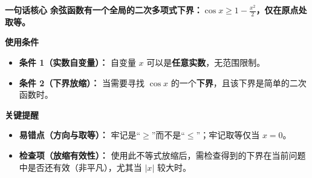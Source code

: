 \begin{summarybox}
\textbf{\textcolor{CSummary}{一句话核心}}
\textbf{余弦函数有一个全局的二次多项式下界：$\cos x \geq 1 - \frac{x^2}{2}$，仅在原点处取等。}

\medskip
\textbf{\textcolor{CSummary}{使用条件}}
\begin{itemize}[leftmargin=*, itemsep=0.5em, topsep=0.4em]
    \item \textbf{条件 1（实数自变量）：} 自变量 $x$ 可以是\textbf{任意实数}，无范围限制。
    \item \textbf{条件 2（下界放缩）：} 当需要寻找 $\cos x$ 的一个\textbf{下界}，且该下界是简单的二次函数时。
\end{itemize}

\medskip
\textbf{\textcolor{CSummary}{关键提醒}}
\begin{itemize}[leftmargin=*, itemsep=0.5em, topsep=0.4em]
    \item \textbf{易错点（方向与取等）：} 牢记是“$\ge$”而不是“$\le$”；牢记取等仅当 $x=0$。
    \item \textbf{检查项（放缩有效性）：} 使用此不等式放缩后，需检查得到的下界在当前问题中是否还有效（非平凡），尤其当 $|x|$ 较大时。
\end{itemize}
\end{summarybox}
